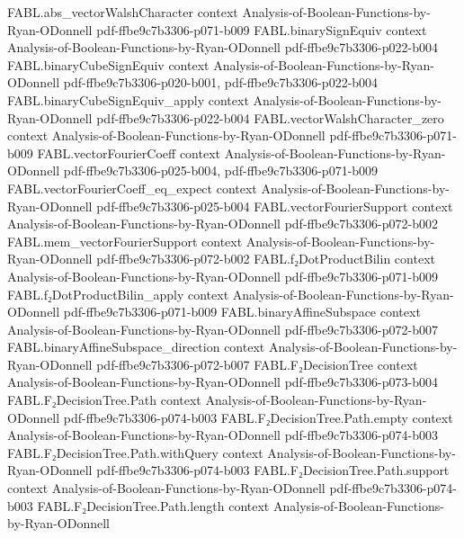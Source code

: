 \begin{theorem}
\proofstep
  {FABL.abs_vectorWalshCharacter}
  {context}
  {Analysis-of-Boolean-Functions-by-Ryan-ODonnell}
  {pdf-ffbe9c7b3306-p071-b009}
\proofstep
  {FABL.binarySignEquiv}
  {context}
  {Analysis-of-Boolean-Functions-by-Ryan-ODonnell}
  {pdf-ffbe9c7b3306-p022-b004}
\proofstep
  {FABL.binaryCubeSignEquiv}
  {context}
  {Analysis-of-Boolean-Functions-by-Ryan-ODonnell}
  {pdf-ffbe9c7b3306-p020-b001,
    pdf-ffbe9c7b3306-p022-b004}
\proofstep
  {FABL.binaryCubeSignEquiv_apply}
  {context}
  {Analysis-of-Boolean-Functions-by-Ryan-ODonnell}
  {pdf-ffbe9c7b3306-p022-b004}
\proofstep
  {FABL.vectorWalshCharacter_zero}
  {context}
  {Analysis-of-Boolean-Functions-by-Ryan-ODonnell}
  {pdf-ffbe9c7b3306-p071-b009}
\proofstep
  {FABL.vectorFourierCoeff}
  {context}
  {Analysis-of-Boolean-Functions-by-Ryan-ODonnell}
  {pdf-ffbe9c7b3306-p025-b004,
    pdf-ffbe9c7b3306-p071-b009}
\proofstep
  {FABL.vectorFourierCoeff_eq_expect}
  {context}
  {Analysis-of-Boolean-Functions-by-Ryan-ODonnell}
  {pdf-ffbe9c7b3306-p025-b004}
\proofstep
  {FABL.vectorFourierSupport}
  {context}
  {Analysis-of-Boolean-Functions-by-Ryan-ODonnell}
  {pdf-ffbe9c7b3306-p072-b002}
\proofstep
  {FABL.mem_vectorFourierSupport}
  {context}
  {Analysis-of-Boolean-Functions-by-Ryan-ODonnell}
  {pdf-ffbe9c7b3306-p072-b002}
\proofstep
  {FABL.f₂DotProductBilin}
  {context}
  {Analysis-of-Boolean-Functions-by-Ryan-ODonnell}
  {pdf-ffbe9c7b3306-p071-b009}
\proofstep
  {FABL.f₂DotProductBilin_apply}
  {context}
  {Analysis-of-Boolean-Functions-by-Ryan-ODonnell}
  {pdf-ffbe9c7b3306-p071-b009}
\proofstep
  {FABL.binaryAffineSubspace}
  {context}
  {Analysis-of-Boolean-Functions-by-Ryan-ODonnell}
  {pdf-ffbe9c7b3306-p072-b007}
\proofstep
  {FABL.binaryAffineSubspace_direction}
  {context}
  {Analysis-of-Boolean-Functions-by-Ryan-ODonnell}
  {pdf-ffbe9c7b3306-p072-b007}
\proofstep
  {FABL.F₂DecisionTree}
  {context}
  {Analysis-of-Boolean-Functions-by-Ryan-ODonnell}
  {pdf-ffbe9c7b3306-p073-b004}
\proofstep
  {FABL.F₂DecisionTree.Path}
  {context}
  {Analysis-of-Boolean-Functions-by-Ryan-ODonnell}
  {pdf-ffbe9c7b3306-p074-b003}
\proofstep
  {FABL.F₂DecisionTree.Path.empty}
  {context}
  {Analysis-of-Boolean-Functions-by-Ryan-ODonnell}
  {pdf-ffbe9c7b3306-p074-b003}
\proofstep
  {FABL.F₂DecisionTree.Path.withQuery}
  {context}
  {Analysis-of-Boolean-Functions-by-Ryan-ODonnell}
  {pdf-ffbe9c7b3306-p074-b003}
\proofstep
  {FABL.F₂DecisionTree.Path.support}
  {context}
  {Analysis-of-Boolean-Functions-by-Ryan-ODonnell}
  {pdf-ffbe9c7b3306-p074-b003}
\proofstep
  {FABL.F₂DecisionTree.Path.length}
  {context}
  {Analysis-of-Boolean-Functions-by-Ryan-ODonnell}

\end{theorem}
